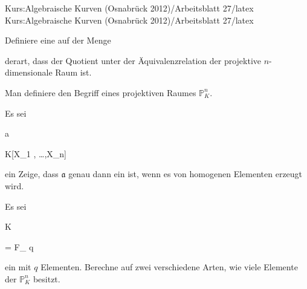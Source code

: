 Kurs:Algebraische Kurven (Osnabrück 2012)/Arbeitsblatt 27/latex
Kurs:Algebraische Kurven (Osnabrück 2012)/Arbeitsblatt 27/latex


\setcounter{section}{27}





{}

{


Definiere eine
auf der Menge

 derart, dass der Quotient unter der Äquivalenzrelation der projektive $n$-dimensionale Raum ist.


}

{} {}



{}

{


Man definiere den Begriff  {} eines projektiven Raumes ${\mathbb P}^{ n }_{ K }$.


}

{} {}



{}

{


Es sei


\mavergleichskette

{\vergleichskette

{ {\mathfrak a}
}

{ \subseteq }{ K[X_1 , \ldots ,X_n]
}

{  }{
}

{    }{
}

{   }{
}

}
{}{}{}
ein
Zeige, dass ${\mathfrak a}$ genau dann ein
ist, wenn es von homogenen Elementen erzeugt wird.


}

{} {}



{}

{


Es sei


\mavergleichskette

{\vergleichskette

{K
}

{ = }{ {\mathbb F}_{  q   }
}

{  }{
}

{    }{
}

{   }{
}

}
{}{}{}
ein
mit $q$ Elementen. Berechne auf zwei verschiedene Arten, wie viele Elemente der
${\mathbb P}^{ n }_{ K}$ besitzt.


}

